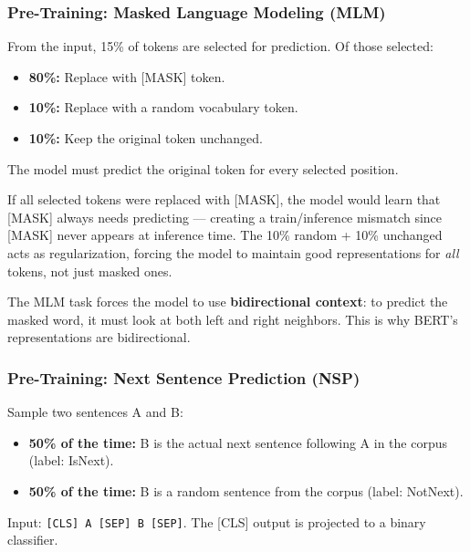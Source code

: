 \documentclass[11pt, a4paper]{article}
\begin{document}
\subsubsection{Pre-Training: Masked Language Modeling (MLM)}

\begin{defbox}
From the input, 15\% of tokens are selected for prediction. Of those selected:
\begin{itemize}[leftmargin=1.5em]
  \item \textbf{80\%:} Replace with [MASK] token.
  \item \textbf{10\%:} Replace with a random vocabulary token.
  \item \textbf{10\%:} Keep the original token unchanged.
\end{itemize}
The model must predict the original token for every selected position.
\end{defbox}

\begin{notebox}
If all selected tokens were replaced with [MASK], the model would learn that [MASK] always needs predicting --- creating a train/inference mismatch since [MASK] never appears at inference time. The 10\% random + 10\% unchanged acts as regularization, forcing the model to maintain good representations for \emph{all} tokens, not just masked ones.
\end{notebox}

The MLM task forces the model to use \textbf{bidirectional context}: to predict the masked word, it must look at both left and right neighbors. This is why BERT's representations are bidirectional.

\subsubsection{Pre-Training: Next Sentence Prediction (NSP)}

\begin{defbox}
Sample two sentences A and B:
\begin{itemize}[leftmargin=1.5em]
  \item \textbf{50\% of the time:} B is the actual next sentence following A in the corpus (label: IsNext).
  \item \textbf{50\% of the time:} B is a random sentence from the corpus (label: NotNext).
\end{itemize}
Input: \texttt{[CLS] A [SEP] B [SEP]}. The [CLS] output is projected to a binary classifier.
\end{defbox}
\end{document}
